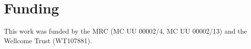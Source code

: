 \documentclass{bioinfo}
\begin{document}
\section*{Funding}
This work was funded by the MRC (MC UU 00002/4, MC UU 00002/13) and the Wellcome Trust (WT107881). 
\vspace*{-12pt}


%
%
%
%
%
%
%
%
  









\end{document}

